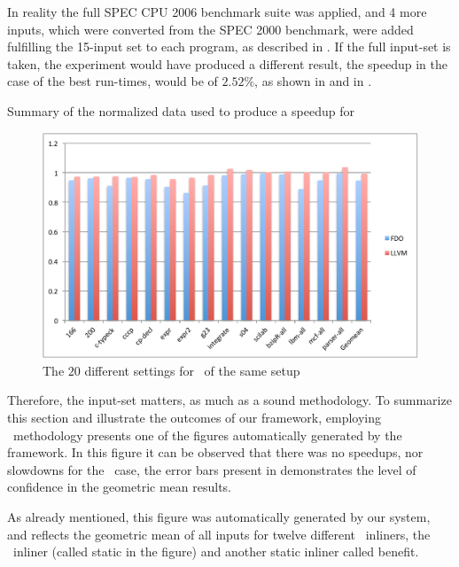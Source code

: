 In reality the full SPEC CPU 2006 benchmark suite was applied, and 4 more inputs, which were converted from the SPEC 2000 benchmark, were added fulfilling the 15-input set to each program, as described in . If the full input-set is taken, the experiment would have produced a different result, the speedup in the case of the best run-times, would be of $2.52 \%$, as shown in  and in .

\begin{table}
  \centering
  \begin{tiny}
  
  \end{tiny}
  \caption{Summary of the normalized data used to produce a speedup for \gcc}
  \label{tab:fullspeedup}
\end{table}

\begin{figure}
  \centering
  \includegraphics[width=1.00\linewidth]{Figures/speedupgccall}
  \caption{The $20$ different settings for \gcc\ of the same setup}
  \label{fig:gccall}
\end{figure}

Therefore, the input-set matters, as much as a sound methodology. To summarize this section and illustrate the outcomes of our framework, employing \CP\ methodology  presents one of the figures automatically generated by the framework. In this figure it can be observed that there was no speedups, nor slowdowns for the \gcc\ case, the error bars present in  demonstrates the level of confidence in the geometric mean results.

As already mentioned, this figure was automatically generated by our system, and reflects the geometric mean of all inputs for twelve different \FDI\ inliners, the \llvm\ inliner (called static in the figure) and another static inliner called benefit.

